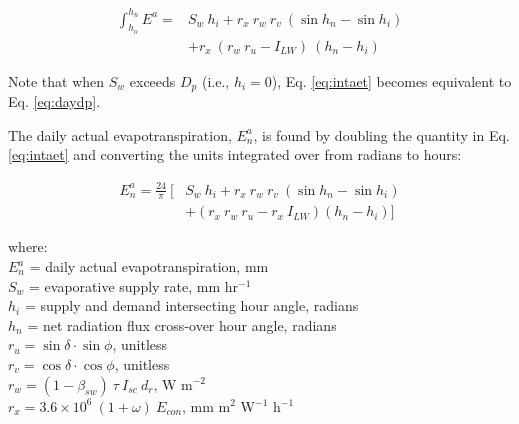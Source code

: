 \begin{equation}
\label{eq:intaet}
	\begin{split}
		\int_{h_o}^{h_n} E^a = & S_w\: h_i + 
		r_x\: r_w\: r_v \: \left(\sin h_n - \sin h_i\right) \\
		& + r_x\: \left(r_w\: r_u - I_{LW} \right)\: \left(h_n - h_i\right)
	\end{split}
\end{equation}

\noindent Note that when $S_w$ exceeds $D_p$ (i.e., $h_i = 0$), Eq. \ref{eq:intaet} becomes equivalent to Eq. \ref{eq:daydp}.

The daily actual evapotranspiration, $E^a_n$, is found by doubling the quantity in Eq. \ref{eq:intaet} and converting the units integrated over from radians to hours:

\begin{equation}
\label{eq:dayaet}
	\begin{split}
		E^a_n = \frac{24}{\pi}\: [ & S_w\: h_i
		          + r_x\: r_w\: r_v \: \left(\sin h_n - \sin h_i\right) \\
		        & + \left(r_x\: r_w\: r_u - r_x\: I_{LW}\right)\left(
		          h_n - h_i\right)]
	\end{split}
\end{equation}

\noindent where:\\
\indent $E^a_n$ = daily actual evapotranspiration, mm\\
\indent $S_w$ = evaporative supply rate, mm hr$^{-1}$\\
\indent $h_i$ = supply and demand intersecting hour angle, radians\\
\indent $h_n$ = net radiation flux cross-over hour angle, radians\\
\indent $r_u = \sin\delta\cdot\sin\phi$, unitless \\
\indent $r_v = \cos\delta\cdot\cos\phi$, unitless \\
\indent $r_w = \left(1-\beta_{sw}\right)\: \tau\: I_{sc}\: d_r$, W m$^{-2}$\\
\indent $r_x = 3.6\times10^6\: \left(1 + \omega\right)\: E_{con}$, mm m$^{2}$ W$^{-1}$ h$^{-1}$\\

